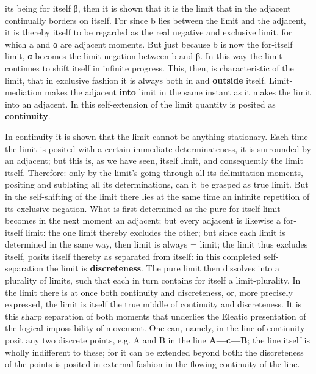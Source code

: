 \documentclass[12pt,a4paper,openany]{book}
\newcommand{\opage}[1]{\marginnote{\footnotesize\textit{[#1]}}}
\begin{document}
its being for itself β, then it is shown that it is
the limit that in the adjacent continually borders
on itself. For since b lies between the limit
and the adjacent, it is thereby itself to be regarded as the real negative and exclusive limit,
for which a and α are adjacent moments. But
just because b is now the for-itself limit,
α becomes the limit-negation between b and β. In this
way the limit continues to shift itself in infinite
progress. This, then, is characteristic of the limit,
that in exclusive fashion it is always both in and \textbf{outside}
itself. Limit-mediation makes the adjacent
\textbf{into} limit in the same instant as it makes the limit
into an adjacent. In this self-extension of the limit quantity is posited as \textbf{continuity}.

In continuity it is shown that the limit cannot
be anything stationary. Each time the limit is posited
with a certain immediate determinateness, it is surrounded
by an adjacent; but this is, as we have seen,
itself limit, and consequently the limit itself. Therefore: only
by the limit's going through all its delimitation-moments, positing and sublating all its determinations,
can it be grasped as true limit. But in
the self-shifting of the limit there lies at the same time an infinite
repetition of its exclusive negation. What
is first determined as the pure for-itself limit
becomes in the next moment an adjacent; but every
adjacent is likewise a for-itself limit:
the one limit thereby excludes the other; but since
each limit is determined in the same way, then
limit is always = limit; the limit thus excludes
\setcounter{footnote}{0}%
\opage{28}itself, posits itself thereby as separated from itself:
in this completed self-separation the limit is \textbf{discreteness}. The pure limit then dissolves into a plurality
of limits, such that each in turn contains for itself
a limit-plurality. In the limit there is at
once both continuity and discreteness, or, more precisely expressed, the limit is itself the true middle of continuity and
discreteness. It is this sharp separation
of both moments that underlies
the Eleatic presentation of the logical impossibility of movement. One can, namely, in the line of continuity posit
any two discrete points, e.g.
A and B in the line \textbf{A---c---B}; the line itself is wholly indifferent
to these; for it can be extended beyond
both: the discreteness of the points is posited in external fashion in the flowing continuity of the line.
\end{document}

